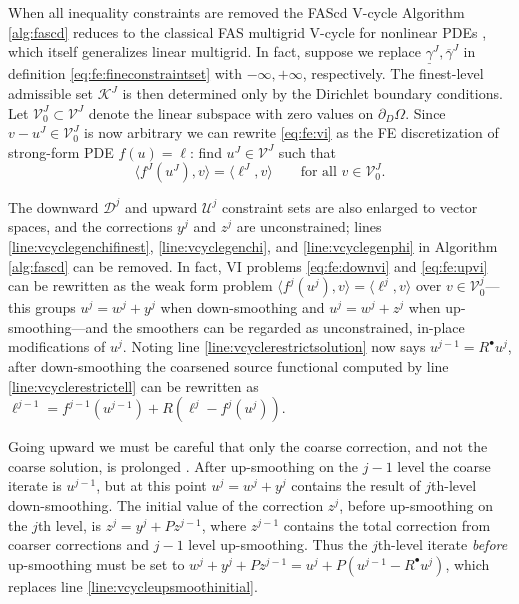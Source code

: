 \documentclass[letterpaper,final,12pt,reqno]{amsart}
\theoremstyle{cstyle}
\theoremstyle{cstyle*}
\theoremstyle{dstyle}
\numberwithin{equation}{section}
\numberwithin{figure}{section}
\numberwithin{table}{section}
\numberwithin{theorem}{section}
\newcommand{\ip}[2]{\langle#1,#2\rangle}
\newcommand{\iR}{R^{\bullet}}
\begin{document}
When all inequality constraints are removed the FAScd V-cycle Algorithm \ref{alg:fascd} reduces to the classical FAS multigrid V-cycle for nonlinear PDEs \cite{Brandt1977,Trottenbergetal2001}, which itself generalizes linear multigrid.  In fact, suppose we replace $\underline{\gamma}^J,\overline{\gamma}^J$ in definition \eqref{eq:fe:fineconstraintset} with $-\infty,+\infty$, respectively.  The finest-level admissible set $\mathcal{K}^J$ is then determined only by the Dirichlet boundary conditions.  Let $\mathcal{V}_0^J \subset \mathcal{V}^J$ denote the linear subspace with zero values on $\partial_D\Omega$.  Since $v-u^J\in\mathcal{V}_0^J$ is now arbitrary we can rewrite \eqref{eq:fe:vi} as the FE discretization of strong-form PDE $f(u)=\ell$: find $u^J \in \mathcal{V}^J$ such that
\begin{equation}
\ip{f^J(u^J)}{v} = \ip{\ell^J}{v} \qquad \text{for all } v\in \mathcal{V}_0^J. \label{eq:app:fas:pde}
\end{equation}

The downward $\mathcal{D}^j$ and upward $\mathcal{U}^j$ constraint sets are also enlarged to vector spaces, and the corrections $y^j$ and $z^j$ are unconstrained; lines \ref{line:vcyclegenchifinest}, \ref{line:vcyclegenchi}, and \ref{line:vcyclegenphi} in Algorithm \ref{alg:fascd} can be removed.  In fact, VI problems \eqref{eq:fe:downvi} and \eqref{eq:fe:upvi} can be rewritten as the weak form problem $\ip{f^j(u^j)}{v} = \ip{\ell^j}{v}$ over $v\in \mathcal{V}_0^j$---this groups $u^j=w^j+y^j$ when down-smoothing and $u^j=w^j+z^j$ when up-smoothing---and the smoothers can be regarded as unconstrained, in-place modifications of $u^j$.  Noting line \ref{line:vcyclerestrictsolution} now says $u^{j-1}=\iR u^j$, after down-smoothing the coarsened source functional computed by line \ref{line:vcyclerestrictell} can be rewritten as $\ell^{j-1} = f^{j-1}\left(u^{j-1}\right) + R\left(\ell^j-f^j(u^j)\right)$.

Going upward we must be careful that only the coarse correction, and not the coarse solution, is prolonged \cite[remark 5.3.9]{Trottenbergetal2001}.  After up-smoothing on the $j-1$ level the coarse iterate is $u^{j-1}$, but at this point $u^j=w^j + y^j$ contains the result of $j$th-level down-smoothing.  The initial value of the correction $z^j$, before up-smoothing on the $j$th level, is $z^j = y^j + P z^{j-1}$, where $z^{j-1}$ contains the total correction from coarser corrections and $j-1$ level up-smoothing.  Thus the $j$th-level iterate \emph{before} up-smoothing must be set to $w^j + y^j + P z^{j-1} = u^j + P(u^{j-1} - \iR u^j)$, which replaces line \ref{line:vcycleupsmoothinitial}.
\end{document}
